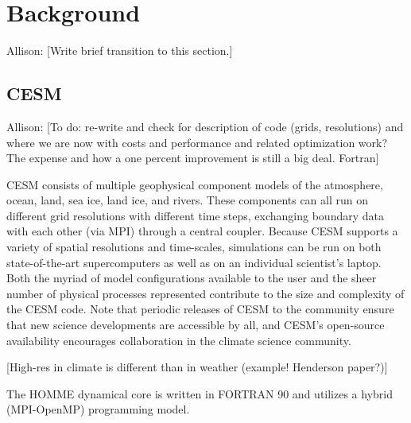 
\section{Background}\label{sec:back}

{\color{red} Allison:} [Write brief transition to this section.]

\subsection{CESM}

{\color{red} Allison:} [To do: re-write and check for description of code (grids, resolutions) and where we are now with costs and performance and related optimization work? The expense and how a one percent improvement is still a big deal.
Fortran]


CESM consists of multiple geophysical component models of the atmosphere, ocean, land, sea ice, land ice, and rivers.  These components can all run on different grid resolutions with different time steps, exchanging boundary data with each other (via MPI) through a central coupler.  Because CESM supports a variety of spatial resolutions and time-scales, simulations can be run on both state-of-the-art supercomputers as well as on an individual scientist's laptop.  Both the myriad of model configurations available to the user and the sheer number of physical processes represented contribute to the size and complexity of the CESM code.  Note that periodic releases of CESM to the community ensure that new science developments are accessible by all, and CESM's open-source availability encourages collaboration in the climate science community.

[High-res in climate is different than in weather (example! Henderson paper?)]

The HOMME dynamical core is written in FORTRAN 90 and utilizes a hybrid (MPI-OpenMP) programming model. 

